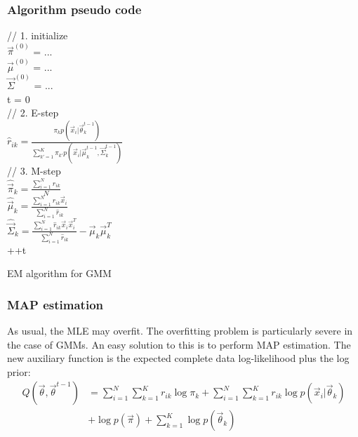 \subsubsection{Algorithm pseudo code}

\begin{algorithm}[htbp]
    \SetAlgoNoLine

	// 1. initialize \\
	$\vec{\pi}^{(0)}$ = ... \\
	$\vec{\mu}^{(0)}$ = ...  \\
	$\vec{\Sigma}^{(0)}$ = ...  \\
	t = 0 \\
	 {
	    // 2. E-step \\
	    $\hat{r}_{ik}=\frac{\pi_kp(\vec{x}_i|\vec{\theta}_k^{t-1})}{\sum_{k'=1}^K \pi_{k'}p(\vec{x}_i|\vec{\mu}_k^{t-1},\vec{\Sigma}_k^{t-1})}$ \\
	    // 3. M-step \\
        $\hat{\vec{\pi}}_k=\frac{\sum_{i=1}^N \hat{r}_{ik}}{N}$ \\
		$\hat{\vec{\mu}}_k  = \frac{\sum_{i=1}^N \hat{r}_{ik}\vec{x}_i}{\sum_{i=1}^N \hat{r}_{ik}}$ \\
		$\hat{\vec{\Sigma}}_k =\frac{\sum_{i=1}^N \hat{r}_{ik}\vec{x}_i\vec{x}_i^T}{\sum_{i=1}^N \hat{r}_{ik}}-\vec{\mu}_k\vec{\mu}_k^T$ \\
        ++t \\
	}
	
\caption{EM algorithm for GMM}
\end{algorithm}


\subsubsection{MAP estimation}
As usual, the MLE may overfit. The overfitting problem is particularly severe in the case of GMMs. An easy solution to this is to perform MAP estimation. The new auxiliary function is the expected complete data log-likelihood plus the log prior:
\begin{equation}\begin{split}
Q(\vec{\theta}, \vec{\theta}^{t-1}) & = \sum\limits_{i=1}^N{\sum\limits_{k=1}^K{r_{ik}\log \pi_k}}+\sum\limits_{i=1}^N{\sum\limits_{k=1}^K{r_{ik}\log p(\vec{x}_i|\vec{\theta}_k)}} \\
 & +\log p(\vec{\pi})+\sum\limits_{k=1}^K{\log p(\vec{\theta}_k)}
\end{split}\end{equation}

